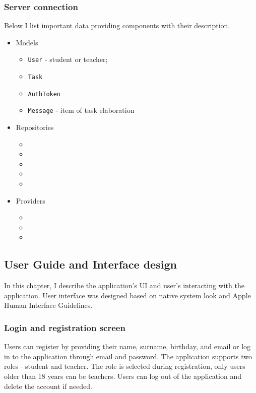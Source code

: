 \documentclass[
  biblatex = false,
  language=english,
  figures=false,
  sourcecodes,
  glossaries,
  index
]{kidiplom}
\begin{document}
\subsubsection{Server connection}
Below I list important data providing components with their description.
\begin{itemize}
	\item Models
	\begin{itemize}
		\item \texttt{User} - student or teacher;
		\item \texttt{Task}
		\item \texttt{AuthToken}
		\item \texttt{Message} - item of task elaboration
	\end{itemize}
	\item Repositories
	\begin{itemize}
		\item {}
		\item {}
		\item {}
		\item {}
		\item {}
	\end{itemize}
	\item Providers
	\begin{itemize}
		\item {}
		\item {}
		\item {}
	\end{itemize}
\end{itemize}

\subsection{User Guide and Interface design}
In this chapter, I describe the application's UI and user's interacting with the application. User interface was designed based on native system look and Apple Human Interface Guidelines.

\subsubsection{Login and registration screen}
Users can register by providing their name, surname, birthday, and email or log in to the application through email and password. The application supports two roles - student and teacher. The role is selected during registration, only users older than 18 years can be teachers. Users can log out of the application and delete the account if needed.
\end{document}
